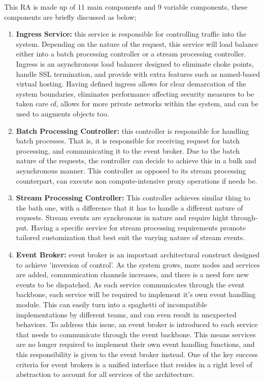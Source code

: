 \documentclass[runningheads]{llncs}
\begin{document}
This RA is made up of 11 main components and 9 variable components, these components are briefly discussed as below; 

\begin{enumerate}
    \item \textbf{Ingress Service:} this service is responsible for controlling traffic into the system. Depending on the nature of the request, this service will load balance either into a batch processing controller or a stream processing controller. Ingress is an asynchronous load balancer designed to eliminate choke points, handle SSL termination, and provide with extra features such as named-based virtual hosting. Having defined ingress allows for clear demarcation of the system boundaries, eliminates performance affecting security measures to be taken care of, allows for more private networks within the system, and can be used to augments objects too. 
    \item \textbf{Batch Processing Controller:} this controller is responsible for handling batch processes. That is, it is responsible for receiving request for batch processing, and communicating it to the event broker. Due to the batch nature of the requests, the controller can decide to achieve this in a bulk and asynchronous manner. This controller as opposed to its stream processing counterpart, can execute non compute-intensive proxy operations if needs be.
    \item \textbf{Stream Processing Controller:} This controller achieves similar thing to the bath one, with a difference that it has to handle a different nature of requests. Stream events are synchronous in nature and require hight through-put. Having a specific service for stream processing requirements promote tailored customization that best suit the varying nature of stream events. 
    \item \textbf{Event Broker:} event broker is an important architectural construct designed to achieve 'inversion of control'. As the system grows, more nodes and services are added, communication channels increases, and there is a need fore new events to be dispatched. As each service communicates through the event backbone, each service will be required to implement it's own event handling module. This can easily turn into a spaghetti of incompatible implementations by different teams, and can even result in unexpected behaviors. To address this issue, an event broker is introduced to each service that needs to communicate through the event backbone. This means services are no longer required to implement their own event handling functions, and this responsibility is given to the event broker instead. One of the key success criteria for event brokers is a unified interface that resides in a right level of abstraction to account for all services of the architecture.

\end{enumerate}
\end{document}
